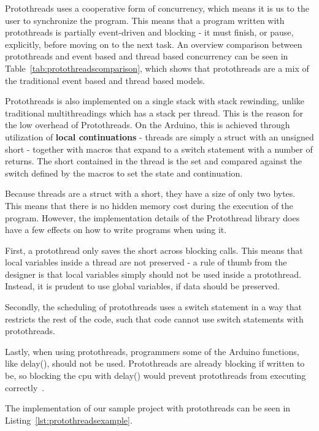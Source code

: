 Protothreads uses a cooperative form of concurrency, which means it is us to the user to synchronize the program. This means that a program written with protothreads is partially event-driven and blocking - it must finish, or pause, explicitly, before moving on to the next task. An overview comparison between protothreads and event based and thread based concurrency can be seen in Table~\ref{tab:protothreadscomparison}, which shows that protothreads are a mix of the traditional event based and thread based models.

Protothreads is also implemented on a single stack with stack rewinding, unlike traditional multithreadings which has a stack per thread. This is the reason for the low overhead of Protothreads. On the Arduino, this is achieved through utilization of \textbf{local continuations} - threads are simply a struct with an unsigned short - together with macros that expand to a switch statement with a number of returns. The short contained in the thread is the set and compared against the switch defined by the macros to set the state and continuation.

Because threads are a struct with a short, they have a size of only two bytes. This means that there is no hidden memory cost during the execution of the program. However, the implementation details of the Protothread library does have a few effects on how to write programs when using it.

First, a protothread only saves the short across blocking calls. This means that local variables inside a thread are not preserved - a rule of thumb from the designer is that local variables simply should not be used inside a protothread. Instead, it is prudent to use global variables, if data should be preserved.

Secondly, the scheduling of protothreads uses a switch statement in a way that restricts the rest of the code, such that code cannot use switch statements with protothreads.

Lastly, when using protothreads, programmers some of the Arduino functions, like delay(), should not be used. Protothreads are already blocking if written to be, so blocking the cpu with delay() would prevent protothreads from executing correctly~\cite{AdamDunkelProtothreads}.

The implementation of our sample project with protothreads can be seen in Listing~\ref{lst:protothreadsexample}.




